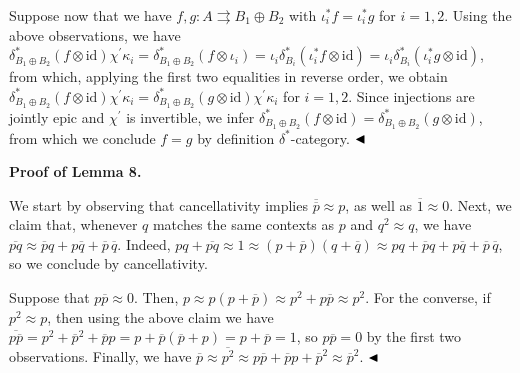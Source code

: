  
 
Suppose now that we have $f,g:A\rightrightarrows B_{1}\oplus B_{2}$ with $\iota_{i}^{*}f=\iota_{i}^{*}g$ for $i=1,2$. Using the above observations, we have $\delta^{\ast}_{B_{1}\oplus B_{2}}(f\otimes\mathrm{id})\chi^{\prime}\kappa_{i}=%
\delta^{\ast}_{B_{1}\oplus B_{2}}(f\otimes\iota_{i})=\iota_{i}\delta^{\ast}_{B%
_{i}}(\iota^{\ast}_{i}f\otimes\mathrm{id})=\iota_{i}\delta^{\ast}_{B_{i}}(%
\iota^{\ast}_{i}g\otimes\mathrm{id})$, from which, applying the first two equalities in reverse order, we obtain $\delta^{\ast}_{B_{1}\oplus B_{2}}(f\otimes\mathrm{id})\chi^{\prime}\kappa_{i}=%
\delta^{\ast}_{B_{1}\oplus B_{2}}(g\otimes\mathrm{id})\chi^{\prime}\kappa_{i}$ for $i=1,2$. Since injections are jointly epic and $\chi^{\prime}$ is invertible, we infer $\delta^{\ast}_{B_{1}\oplus B_{2}}(f\otimes\mathrm{id})=\delta^{\ast}_{B_{1}%
\oplus B_{2}}(g\otimes\mathrm{id})$, from which we conclude $f=g$ by definition $\delta^{\ast}$-category. $\hfill\blacktriangleleft$\par
 
 
 
 
\par\medskip\noindent\textbf{Proof of Lemma 8.}\par
 
 
We start by observing that cancellativity implies $\overline{\overline{p}}\approx p$, as well as $\overline{1}\approx 0$. Next, we claim that, whenever $q$ matches the same contexts as $p$ and $q^{2}\approx q$, we have $\overline{pq}\approx\overline{p}q+p\overline{q}+\overline{p}\,\overline{q}$. Indeed, $pq+\overline{pq}\approx 1\approx(p+\overline{p})(q+\overline{q})\approx pq+%
\overline{p}q+p\overline{q}+\overline{p}\,\overline{q}$, so we conclude by cancellativity.\par
 
 
 
Suppose that $p\overline{p}\approx 0$. Then, $p\approx p(p+\overline{p})\approx p^{2}+p\overline{p}\approx p^{2}$. For the converse, if $p^{2}\approx p$, then using the above claim we have $\overline{p\overline{p}}=p^{2}+\overline{p}^{2}+\overline{p}p=p+\overline{p}(%
\overline{p}+p)=p+\overline{p}=1$, so $p\overline{p}=0$ by the first two observations. Finally, we have $\overline{p}\approx\overline{p^{2}}\approx p\overline{p}+\overline{p}p+%
\overline{p}^{2}\approx\overline{p}^{2}$. $\hfill\blacktriangleleft$\par
 
